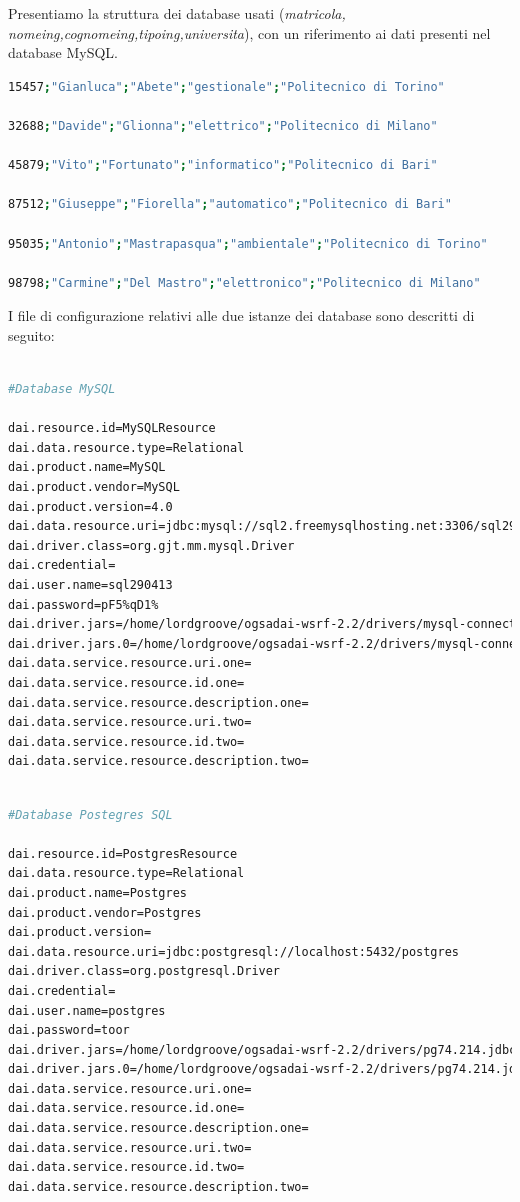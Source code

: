 \documentclass[11pt]{article}
\begin{document}
Presentiamo la struttura dei database usati (\textit{matricola, nomeing,cognomeing,tipoing,universita}), con un riferimento ai dati presenti nel database MySQL. \\

\begin{lstlisting}[language=bash]
15457;"Gianluca";"Abete";"gestionale";"Politecnico di Torino"

32688;"Davide";"Glionna";"elettrico";"Politecnico di Milano"

45879;"Vito";"Fortunato";"informatico";"Politecnico di Bari"

87512;"Giuseppe";"Fiorella";"automatico";"Politecnico di Bari"

95035;"Antonio";"Mastrapasqua";"ambientale";"Politecnico di Torino"

98798;"Carmine";"Del Mastro";"elettronico";"Politecnico di Milano"
\end{lstlisting}

I file di configurazione relativi alle due istanze dei database sono descritti di seguito: 

\begin{lstlisting}[language=bash]

#Database MySQL

dai.resource.id=MySQLResource
dai.data.resource.type=Relational
dai.product.name=MySQL
dai.product.vendor=MySQL
dai.product.version=4.0
dai.data.resource.uri=jdbc:mysql://sql2.freemysqlhosting.net:3306/sql290413
dai.driver.class=org.gjt.mm.mysql.Driver
dai.credential=
dai.user.name=sql290413
dai.password=pF5%qD1%
dai.driver.jars=/home/lordgroove/ogsadai-wsrf-2.2/drivers/mysql-connector-java-5.1.36-bin.jar,
dai.driver.jars.0=/home/lordgroove/ogsadai-wsrf-2.2/drivers/mysql-connector-java-5.1.36-bin.jar
dai.data.service.resource.uri.one=
dai.data.service.resource.id.one=
dai.data.service.resource.description.one=
dai.data.service.resource.uri.two=
dai.data.service.resource.id.two=
dai.data.service.resource.description.two=

\end{lstlisting}

\begin{lstlisting}[language=bash]

#Database Postegres SQL

dai.resource.id=PostgresResource
dai.data.resource.type=Relational
dai.product.name=Postgres
dai.product.vendor=Postgres
dai.product.version=
dai.data.resource.uri=jdbc:postgresql://localhost:5432/postgres
dai.driver.class=org.postgresql.Driver
dai.credential=
dai.user.name=postgres
dai.password=toor
dai.driver.jars=/home/lordgroove/ogsadai-wsrf-2.2/drivers/pg74.214.jdbc3.jar,
dai.driver.jars.0=/home/lordgroove/ogsadai-wsrf-2.2/drivers/pg74.214.jdbc3.jar
dai.data.service.resource.uri.one=
dai.data.service.resource.id.one=
dai.data.service.resource.description.one=
dai.data.service.resource.uri.two=
dai.data.service.resource.id.two=
dai.data.service.resource.description.two=
\end{lstlisting}
\end{document}
